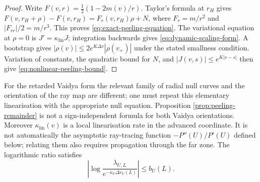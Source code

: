 \documentclass[11pt,a4paper]{article}
\theoremstyle{definition}
\theoremstyle{remark}
\begin{document}
	\begin{proof}
		Write $F(v,r)=\frac12(1-2m(v)/r)$.  Taylor's formula at $r_H$ gives
		$F(v,r_H+\rho)-F(v,r_H)=F_r(v,r_H)\rho+N$, where
		$F_r=m/r^2$ and $|F_{rr}|/2=m/r^3$.  This proves
		\eqref{eq:exact-peeling-equation}.  The variational equation at $\rho=0$ is
		$J'=\kappa_{\mathrm{lin}}J$; integration backwards gives
		\eqref{eq:dynamic-scaling-form}.  A bootstrap gives
		$|\rho(v)|\leq2e^{K\Delta v}|\rho(v_+)|$ under the stated smallness condition.
		Variation of constants, the quadratic bound for $N$, and
		$|J(v,s)|\leq e^{K|v-s|}$ then give
		\eqref{eq:nonlinear-peeling-bound}.
	\end{proof}
	For the retarded Vaidya form the relevant family of radial null curves and
	the orientation of the ray map are different; one must repeat this elementary
	linearisation with the appropriate null equation.  Proposition
	\ref{prop:peeling-remainder} is not a sign-independent formula for both
	Vaidya orientations.  Moreover $\kappa_{\mathrm{lin}}(v)$ is a local
	linearisation rate in the advanced coordinate.  It is not automatically the
	asymptotic ray-tracing function $-P''(U)/P'(U)$ defined below; relating them
	also requires propagation through the far zone.
	The logarithmic ratio satisfies
	\begin{equation}
		\left|\log\frac{\lambda_{U,L}}
		{e^{-\kappa_U\Delta v_U(L)}}\right|
		\leq b_U(L).
		\label{eq:lambda-ratio-bound}
	\end{equation}
	
\end{document}
